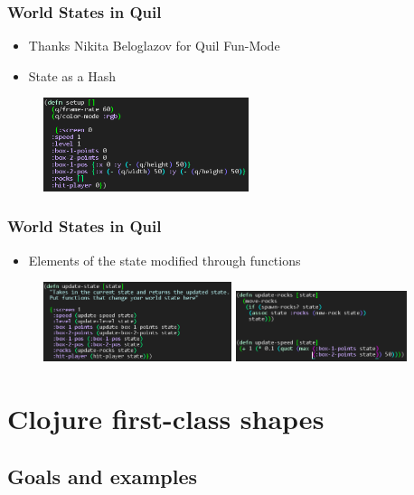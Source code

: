\documentclass{beamer}
\begin{document}
\begin{frame}
\frametitle{World States in Quil}
	\begin{itemize}
		\item Thanks Nikita Beloglazov for Quil Fun-Mode
		\item State as a Hash
	\end{itemize}
	\begin{figure}
		\includegraphics[width=6cm]{PresentationImages/setupCode.png}
	\end{figure}
\end{frame}

\begin{frame}
\frametitle{World States in Quil}
\begin{itemize}
		\item Elements of the state modified through functions
	\end{itemize}
	\begin{figure}
		\includegraphics[width=5.5cm]{PresentationImages/updateCode.png}
		\hspace{0.1cm}
		\includegraphics[width=5cm]{PresentationImages/updateFunctionsCode.png}
	\end{figure}
\end{frame}


\section{Clojure first-class shapes}

\subsection{Goals and examples}
\end{document}
